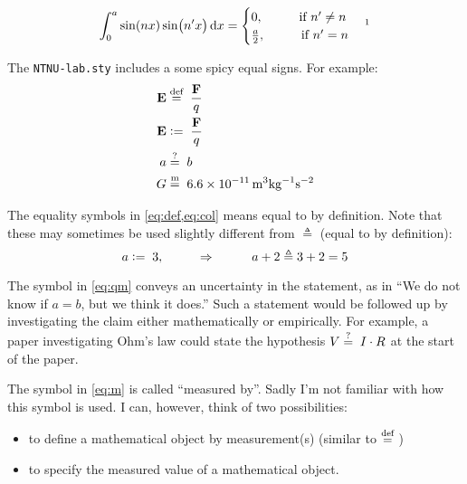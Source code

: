 \begin{align*} %
    \int_{0}^{a}\sin(nx)\sin(n'x) \dd x = 
    \begin{cases} 
        0, \hspace{1cm} \text{if } n'\neq n \\ 
        \frac{a}{2}, \hspace{1cm} \text{if } n'= n
    \end{cases}
    \footnotemark{}
\end{align*}

The \verb+NTNU-lab.sty+ includes a some spicy equal signs. For example: 
\begin{align}
    \vb{E} & \defeq \frac{\vb{F}}{q} \label{eq:def} \\
    \vb{E} &\coleq\frac{\vb{F}}{q} \label{eq:col} \\
    a      &\qmeq b                 \label{eq:qm}  \\
    G      &\meq \SI{6.6e-11}{m^3 kg^{-1} s^{-2}}  \label{eq:m} 
\end{align}

The equality symbols in \cref{eq:def,eq:col} means equal to by definition. Note that these may sometimes be used slightly different from $\triangleq$ (equal to by definition):
\begin{equation*}
    a \coleq 3, \hspace{1cm} \Rightarrow \hspace{1cm} a+2 \triangleq 3+2 = 5
\end{equation*}

The symbol in \cref{eq:qm} conveys an uncertainty in the statement, as in ``We do not know if $a=b$, but we think it does.'' Such a statement would be followed up by investigating the claim either mathematically or empirically. For example, a paper investigating Ohm's law could state the hypothesis $V\qmeq I\cdot R$ at the start of the paper.\par

The symbol in \cref{eq:m} is called ``measured by''. Sadly I'm not familiar with how this symbol is used. I can, however, think of two possibilities: \par
\begin{itemize}
    \item to define a mathematical object\footnotemark{} by measurement(s) (similar to $\defeq$)
    \item to specify the measured value of a mathematical object.
\end{itemize}

